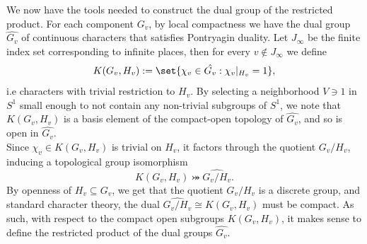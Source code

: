 \documentclass[11pt, x11names, openany]{book}
\begin{document}
We now have the tools needed to construct the dual group of the restricted product. For each component $G_v$, by local compactness we have the dual group $\hat{G_v}$ of continuous characters that satisfies Pontryagin duality. Let $J_\infty$ be the finite index set corresponding to infinite places, then for every $v \notin J_\infty$ we define
\begin{equation*}
    K(G_v, H_v) := \set{\chi_v \in \hat{G_v} : \chi_v \vert_{H_v} = 1},
\end{equation*}
i.e characters with trivial restriction to $H_v$. By selecting a neighborhood $V \ni 1$ in $S^1$ small enough to not contain any non-trivial subgroups of $S^1$, we note that $K(G_v, H_v)$ is a basis element of the compact-open topology of $\hat{G_v}$, and so is open in $\hat{G_v}$.\\
Since $\chi_v \in K(G_v, H_v)$ is trivial on $H_v$, it factors through the quotient $G_v/H_v$, inducing a topological group isomorphism
\begin{equation*}
    K(G_v, H_v) \bij \hat{G_v/H_v}.
\end{equation*}
By openness of $H_v \subseteq G_v$, we get that the quotient $G_v/H_v$ is a discrete group, and standard character theory, the dual $\hat{G_v/H_v} \cong K(G_v, H_v)$ must be compact. As such, with respect to the compact open subgroups $K(G_v, H_v)$, it makes sense to define the restricted product of the dual groups $\hat{G_v}$.
\end{document}
